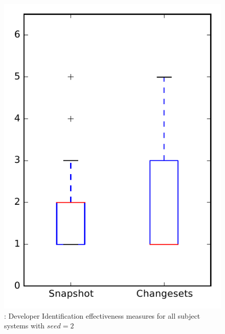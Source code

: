 
\begin{figure}
\centering
\includegraphics[height=0.4\textheight]{figures/dit_seed/rq1_overview_2}
\caption{\rtwo: Developer Identification effectiveness measures for all subject systems with $seed=2$}
\label{fig:dit_seed:rq1:overview}
\end{figure}
